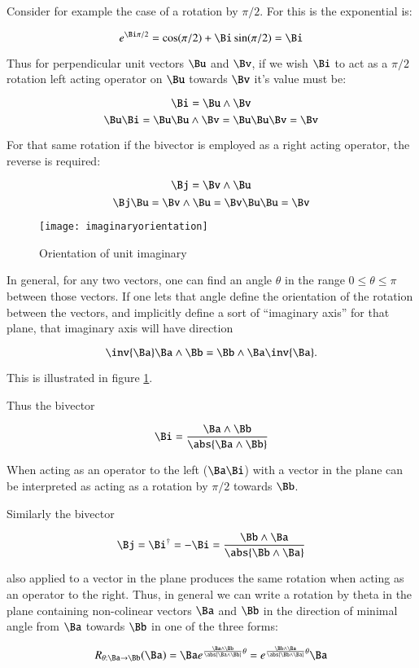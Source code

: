 Consider for example the case of a rotation by $\pi/2$.  For this is the exponential is:

\[
e^{\Bi\pi/2} = \cos(\pi/2) + \Bi \sin(\pi/2) = \Bi
\]

Thus for perpendicular unit vectors $\Bu$ and $\Bv$, if we wish $\Bi$ to act as a $\pi/2$ rotation left acting operator on $\Bu$
towards $\Bv$ it's value must be:

\[
\Bi = \Bu \wedge \Bv
\]
\[
\Bu\Bi = \Bu \Bu \wedge \Bv = \Bu\Bu\Bv = \Bv
\]

For that same rotation if the bivector is employed as a right acting operator, the reverse is required:

\[
\Bj = \Bv \wedge \Bu
\]
\[
\Bj\Bu = \Bv \wedge \Bu = \Bv\Bu\Bu = \Bv
\]

\begin{figure}[htp]
\centering
\texttt{[image: imaginaryorientation]}
\caption{Orientation of unit imaginary}\label{fig:imaginaryorientation}
\end{figure}

In general, for any two vectors, one can find an angle $\theta$ in the range $0 \le \theta \le \pi$ between those vectors.  
If one lets that angle define the orientation of the rotation between the vectors, and implicitly
define a sort of ``imaginary axis'' for that plane, that imaginary axis will have direction

\[
\inv{\Ba} \Ba \wedge \Bb = \Bb \wedge \Ba \inv {\Ba}.
\]

This is illustrated in figure \ref{fig:imaginaryorientation}.

Thus the bivector

\[
\Bi = \frac{\Ba \wedge \Bb}{\abs{\Ba \wedge \Bb}}
\]

When acting as an operator to the left ($\Ba \Bi$) with a vector in the plane can be interpreted as acting as a rotation by $\pi/2$ towards $\Bb$.

Similarly the bivector

\[
\Bj = \Bi^\dagger = -\Bi = \frac{\Bb \wedge \Ba}{\abs{\Bb \wedge \Ba}}
\]

also applied to a vector in the plane produces the same rotation when 
acting as an operator to the right.  Thus, in general we can write
a rotation by theta in the plane containing non-colinear vectors $\Ba$ and $\Bb$ in the direction of minimal angle
from $\Ba$ towards $\Bb$ in one of the three forms:

\[
R_{\theta : \Ba \rightarrow \Bb}(\Ba)
= \Ba e^{ \frac{\Ba \wedge \Bb}{\abs{\Ba \wedge \Bb}} \theta }
= e^{ \frac{\Bb \wedge \Ba}{\abs{\Bb \wedge \Ba}} \theta } \Ba
\]

